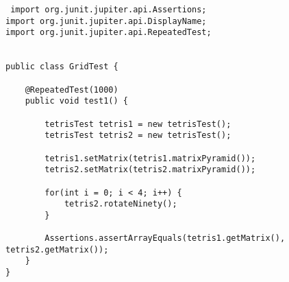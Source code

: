 \documentclass[a4paper,12pt,titlepage]{article}
\theoremstyle{definition}
\theoremstyle{remark}
\begin{document}
\begin{lstlisting}
 import org.junit.jupiter.api.Assertions;
import org.junit.jupiter.api.DisplayName;
import org.junit.jupiter.api.RepeatedTest;


public class GridTest {

    @RepeatedTest(1000)
    public void test1() {

        tetrisTest tetris1 = new tetrisTest();
        tetrisTest tetris2 = new tetrisTest();

        tetris1.setMatrix(tetris1.matrixPyramid());
        tetris2.setMatrix(tetris2.matrixPyramid());

        for(int i = 0; i < 4; i++) {
            tetris2.rotateNinety();
        }

        Assertions.assertArrayEquals(tetris1.getMatrix(), tetris2.getMatrix());
    }
}

\end{lstlisting}
\end{document}
